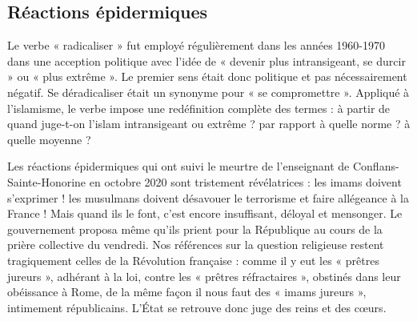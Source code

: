 \subsection{Réactions épidermiques}

Le verbe « radicaliser » fut employé régulièrement dans les années
1960-1970 dans une acception politique avec l'idée de « devenir plus
intransigeant, se durcir » ou « plus extrême ». Le premier sens était
donc politique et pas nécessairement négatif. Se déradicaliser était un
synonyme pour « se compromettre ». Appliqué à l'islamisme, le verbe
impose une redéfinition complète des termes : à partir de quand
juge-t-on l'islam intransigeant ou extrême ? par rapport à quelle norme
? à quelle moyenne ?

Les réactions épidermiques qui ont suivi le meurtre de l'enseignant de
Conflans-Sainte-Honorine en octobre 2020 sont tristement révélatrices :
les imams doivent s'exprimer ! les musulmans doivent désavouer le
terrorisme et faire allégeance à la France ! Mais quand ils le font,
c'est encore insuffisant, déloyal et mensonger. Le gouvernement proposa
même qu'ils prient pour la République au cours de la prière collective
du vendredi. Nos références sur la question religieuse restent
tragiquement celles de la Révolution française : comme il y eut les «
prêtres jureurs », adhérant à la loi, contre les « prêtres réfractaires
», obstinés dans leur obéissance à Rome, de la même façon il nous faut
des « imams jureurs », intimement républicains. L'État se retrouve donc
juge des reins et des cœurs.
